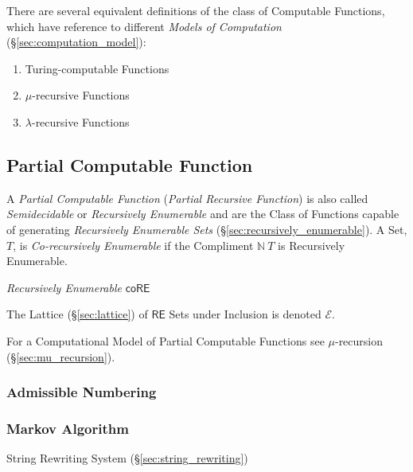 There are several equivalent definitions of the class of Computable
Functions, which have reference to different \emph{Models of
  Computation} (\S\ref{sec:computation_model}):
\begin{enumerate}
\item Turing-computable Functions
\item $\mu$-recursive Functions
\item $\lambda$-recursive Functions
\end{enumerate}



\subsection{Partial Computable Function}\label{sec:partial_recursive}

A \emph{Partial Computable Function} (\emph{Partial Recursive
  Function}) is also called \emph{Semidecidable} or \emph{Recursively
  Enumerable} and are the Class of Functions capable of generating
\emph{Recursively Enumerable Sets}
(\S\ref{sec:recursively_enumerable}). A Set, $T$, is
\emph{Co-recursively Enumerable} if the Compliment $\mathbb{N} \ T$ is
Recursively Enumerable.

\emph{Recursively Enumerable} $\mathsf{coRE}$

The Lattice (\S\ref{sec:lattice}) of $\mathsf{RE}$ Sets under
Inclusion is denoted $\mathcal{E}$.

For a Computational Model of Partial Computable Functions see
$\mu$-recursion (\S\ref{sec:mu_recursion}).



\subsubsection{Admissible Numbering}\label{sec:admissible_numbering}



\subsubsection{Markov Algorithm}\label{sec:markov_algorithm}

String Rewriting System (\S\ref{sec:string_rewriting})



